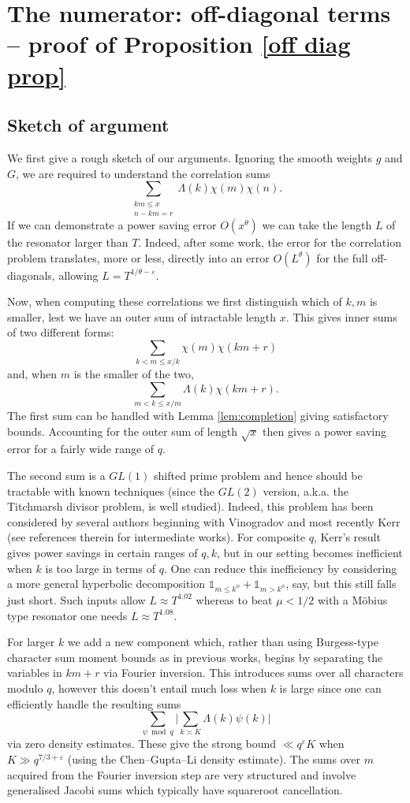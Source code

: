 \documentclass[12pt, oneside]{amsart}
\theoremstyle{definition}
\newcommand{\leqs}{\leqslant }
\newcommand{\eps}{\varepsilon}
\newcommand{\1}{\mathds{1}}
\begin{document}
\section{The numerator: off-diagonal terms -- proof of Proposition \ref{off diag prop}}

\subsection{Sketch of argument}\label{rough sketch sec}
We first give a rough sketch of our arguments. Ignoring the smooth weights $g$ and $G$, we are required to understand the correlation sums
\[
\sum_{\substack{km\leqs x\\n-km=r}}\Lambda(k)\chi(m)\chi(n).
\]
If we can demonstrate a power saving error $O(x^\theta)$ we can take the length $L$ of the resonator larger than $T$. Indeed, after some work, the error for the correlation problem translates, more or less, directly into an error $O(L^\theta)$ for the full off-diagonals, allowing $L=T^{1/\theta-\eps}$. 

Now, when computing these correlations we first distinguish which of $k,m$ is smaller, lest we have an outer sum of intractable length $x$. This gives inner sums of two different forms:
\[
\sum_{k<m\leqs x/k}\chi(m)\chi(km+r)
\]
and, when $m$ is the smaller of the two,
\[
\sum_{m<k\leqs x/m}\Lambda(k)\chi(km+r). 
\]
The first sum can be handled with Lemma \ref{lem:completion} giving satisfactory bounds. Accounting for the outer sum of length $\sqrt{x}$ then gives a power saving error for a fairly wide range of $q$. 

The second sum is a $GL(1)$ shifted prime problem and hence should be tractable with known techniques (since the $GL(2)$ version, a.k.a. the Titchmarsh divisor problem, is well studied). Indeed, this problem has been considered by several authors beginning with Vinogradov and most recently Kerr \cite{Kerr} (see references therein for intermediate works). For composite $q$, Kerr's result gives power savings in certain ranges of $q,k$, but in our setting becomes inefficient when $k$ is too large in terms of $q$. One can reduce this inefficiency by considering a more general hyperbolic decomposition $\mathds{1}_{m\leqs k^\phi}+\mathds{1}_{m>k^\phi}$, say, 
 but this still falls just short. Such inputs allow $L\approx T^{1.02}$ whereas to beat $\mu<1/2$ with a M\"obius type resonator one needs $L\approx T^{1.08}$.  

For larger $k$ we add a new component which, rather than using Burgess-type character sum moment bounds as in previous works, begins by separating the variables in $km+r$ via Fourier inversion. This introduces sums over all characters modulo $q$, however this doesn't entail much loss when $k$ is large since one can efficiently handle the resulting sums 
\[
\sum_{\psi\bmod q}\bigg|\sum_{k\asymp K} \Lambda(k)\psi(k)\bigg|
\]   
via zero density estimates. These give the strong bound $\ll q^\eps K$ when $K\gg q^{7/3+\eps}$ (using the Chen--Gupta--Li density estimate). The sums over $m$ acquired from the Fourier inversion step are very structured and involve generalised Jacobi sums which typically have squareroot cancellation. 
\end{document}
